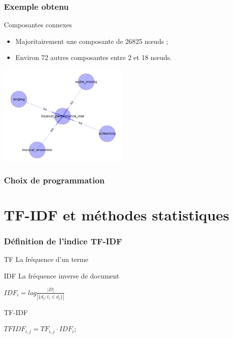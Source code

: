 \documentclass[12pt, handout]{beamer}
\begin{document}
\begin{frame}
 \frametitle{Exemple obtenu}
 
 \begin{block}{Composantes connexes}
 \begin{itemize}
  \item Majoritairement une composante de 26825 n\oe uds ;
  \item Environ 72 autres composantes entre 2 et 18 n\oe uds.
 \end{itemize}
 \end{block}

 \includegraphics[height=5cm]{./images/comp_connexe_3.png}
 
 
\end{frame}



\begin{frame}
 \frametitle{Choix de programmation}
 
 
\end{frame}


\section{TF-IDF et méthodes statistiques}

\begin{frame}
 \frametitle{Définition de l'indice TF-IDF}
 \begin{block}{TF}
 	La fréquence d'un terme
 \end{block}
 \begin{block}{IDF}
 	La fréquence inverse de document\\
 	\begin{center}
 	 	$IDF_{i} =  log \frac{|D|}{|\{d_{j}: t_{i} \in d_{j}\}|}$
 	\end{center}
 \end{block}
 \begin{block}{TF-IDF}
 	\begin{center}
 		$TFIDF_{i,j} = TF_{i,j} \cdot  IDF_{i}$;
 	\end{center}
 \end{block}
\end{frame}
\end{document}
